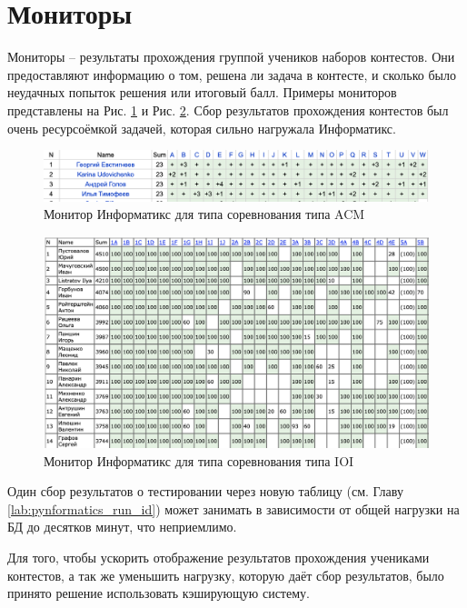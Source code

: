 
\section{Мониторы}

Мониторы -- результаты прохождения группой учеников наборов контестов.
Они предоставляют информацию о том, решена ли задача в контесте,
и сколько было неудачных попыток решения или итоговый балл. 
Примеры мониторов представлены на Рис. \ref{fig:monitor_acm} и Рис. \ref{fig:monitor_ioi}.
Сбор результатов прохождения контестов был очень ресурсоёмкой задачей,
которая сильно нагружала Информатикс.

\begin{figure}
  \centering
  \includegraphics[width=\textwidth]{figures/monitor_acm.png}
  \caption{Монитор Информатикс для типа соревнования типа ACM}
  \label{fig:monitor_acm}
\end{figure}

\begin{figure}
  \centering
  \includegraphics[width=\textwidth]{figures/monitor_ioi.png}
  \caption{Монитор Информатикс для типа соревнования типа IOI}
  \label{fig:monitor_ioi}
\end{figure}

Один сбор результатов о тестировании через новую таблицу (см. Главу \ref{lab:pynformatics_run_id}) может занимать в зависимости от общей нагрузки на БД до десятков минут, что неприемлимо.

Для того, чтобы ускорить отображение результатов прохождения учениками контестов, 
а так же уменьшить нагрузку, которую даёт сбор результатов, 
было принято решение использовать кэширующую систему\cite{cache_abstract}.


